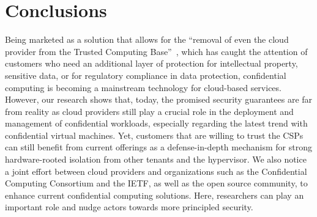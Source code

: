 \section{Conclusions}
%
Being marketed as a solution that allows for the ``removal
of even the cloud provider from the Trusted Computing
Base''~\cite{confcon2022marketing}, which has
caught the attention of customers who need an additional layer of protection for
intellectual property, sensitive data, or for regulatory compliance in data
protection, confidential computing is becoming a mainstream technology for
cloud-based services.
%
However, our research shows that, today, the promised security guarantees are
far from reality as cloud providers still play a crucial role in the deployment
and management of confidential workloads, especially regarding the latest trend
with confidential virtual machines. Yet, customers that are willing to trust the
CSPs can still benefit from current offerings as a defense-in-depth mechanism
for strong hardware-rooted isolation from other tenants and the hypervisor.
%
We also notice a joint effort between cloud providers and organizations such as
the Confidential Computing Consortium and the IETF, as well as the open source
community, to enhance current confidential computing solutions. Here,
researchers can play an important role and nudge actors towards more principled
security.

